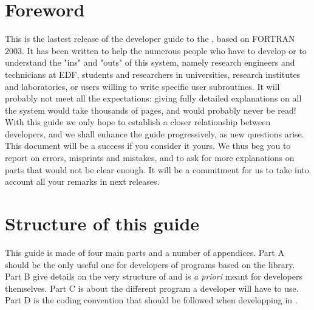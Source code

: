 %
\chapter{Foreword}
%
%
This is the lastest release of the developer guide to the \telemacsystem, based
on FORTRAN 2003. It has been written to help the numerous people who have to
develop or to understand the "ins" and "outs" of this system, namely research
engineers and technicians at EDF, students and researchers in universities,
research institutes and laboratories, or users willing to write specific user
subroutines. It will probably not meet all the expectations: giving fully
detailed explanations on all the system would take thousands of pages, and
would probably never be read! With this guide we only hope to establish a
closer relationship between developers, and we shall enhance the guide
progressively, as new questions arise. This document will be a success if you
consider it yours. We thus beg you to report on errors, misprints and mistakes,
and to ask for more explanations on parts that would not be clear enough. It
will be a commitment for us to take into account all your remarks in next
releases.
%
%
\chapter{Structure of this guide}
%
%
This guide is made of four main parts and a number of appendices. Part A should
be the only useful one for developers of programs based on the \bief library.
Part B give details on the very structure of \bief and is \textit{a priori}
meant for \bief developers themselves. Part C is about the different program a
developer will have to use. Part D is the coding convention that should be
followed when developping in \telemacsystem.

